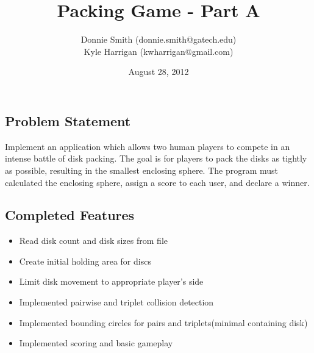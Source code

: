 \documentclass[a4paper]{article}
\title{Packing Game - Part A}
\author{
Donnie Smith (donnie.smith@gatech.edu) \\
Kyle Harrigan (kwharrigan@gmail.com) 
}
\date{August 28, 2012}                                           %
\begin{document}
\begingroup
\let\center\flushleft
\let\endcenter\endflushleft
\maketitle
\endgroup



 \subsection{Problem Statement}
  
Implement an application which allows two human players to compete in an intense battle of disk packing.  The goal is for players to pack the disks as tightly as possible, resulting in the smallest enclosing sphere.  The program must calculated the enclosing sphere, assign a score to each user, and declare a winner.  
 
 \subsection{Completed Features}
 \begin{multicols}{2}
 \begin{itemize}
\setlength\multicolsep{0pt}
\item Read disk count and disk sizes from file
\item Create initial holding area for discs
\item Limit disk movement to appropriate player's side
\item Implemented pairwise and triplet collision detection
\item Implemented bounding circles for pairs and triplets(minimal containing disk)
\item Implemented scoring and basic gameplay
\end{itemize}
\end{multicols}
\end{document}
